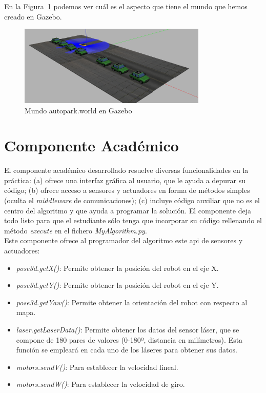 En la Figura~\ref{fig.Mundo_Autopark} podemos ver cuál es el aspecto que tiene el mundo que hemos creado en Gazebo.

\begin{figure}[H]
  \begin{center}
    \includegraphics[width=0.8\textwidth]{figures/Autopark/Mundo_Autopark.png}
		\caption{Mundo autopark.world en Gazebo}
		\label{fig.Mundo_Autopark}
		\end{center}
\end{figure}

\section{Componente Académico}
El componente académico desarrollado resuelve diversas funcionalidades en la práctica: (a) ofrece una interfaz gráfica al usuario, que le ayuda a depurar su código; (b) ofrece acceso a sensores y actuadores en forma de métodos simples (oculta el \textit{middleware} de comunicaciones); (c) incluye código auxiliar que no es el centro del algoritmo y que ayuda a programar la solución. El componente deja todo listo para que el estudiante sólo tenga que incorporar su código rellenando el método \textit{execute} en el fichero \textit{MyAlgorithm.py}.\\

Este componente ofrece al programador del algoritmo este \acrshort{api} de sensores y actuadores:

\begin{itemize}
\item \textit{pose3d.getX()}: Permite obtener la posición del robot en el eje X.
\item	\textit{pose3d.getY()}: Permite obtener la posición del robot en el eje Y.
\item	\textit{pose3d.getYaw()}: Permite obtener la orientación del robot con respecto al mapa.
\item	\textit{laser.getLaserData()}: Permite obtener los datos del sensor láser, que se compone de 180 pares de valores (0-180º, distancia en milímetros). Esta función se empleará en cada uno de los láseres para obtener sus datos.
\item \textit{motors.sendV()}: Para establecer la velocidad lineal.
\item	\textit{motors.sendW()}: Para establecer la velocidad de giro.
\end{itemize}

